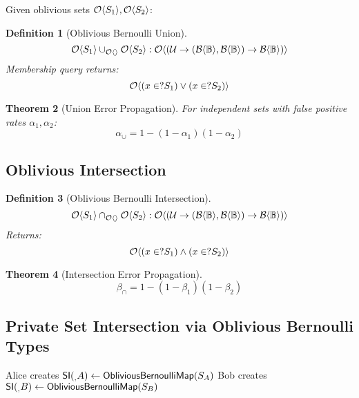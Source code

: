 \documentclass[11pt,final,hidelinks]{article}
\newcommand{\BernBool}{\mathcal{B}\langle \Bool \rangle}
\newcommand{\fprate}{\alpha}
\newcommand{\fnrate}{\beta}
\newtheorem{theorem}{Theorem}[section]
\newtheorem{definition}[theorem]{Definition}
\begin{document}
Given oblivious sets $\mathcal{O}\langle S_1 \rangle, \mathcal{O}\langle S_2 \rangle$:

\begin{definition}[Oblivious Bernoulli Union]
\begin{equation}
\Obv{S_1} \cup_{\Obv{}} \Obv{S_2} : \ObvMap{\Universe}{(\BernBool, \BernBool) \to \BernBool}
\end{equation}
Membership query returns:
\begin{equation}
\mathcal{O}\langle (x \in? S_1) \lor (x \in? S_2) \rangle
\end{equation}
\end{definition}

\begin{theorem}[Union Error Propagation]
For independent sets with false positive rates $\fprate_1, \fprate_2$:
\begin{equation}
\fprate_{\cup} = 1 - (1 - \fprate_1)(1 - \fprate_2)
\end{equation}
\end{theorem}

\subsection{Oblivious Intersection}

\begin{definition}[Oblivious Bernoulli Intersection]
\begin{equation}
\Obv{S_1} \cap_{\Obv{}} \Obv{S_2} : \ObvMap{\Universe}{(\BernBool, \BernBool) \to \BernBool}
\end{equation}
Returns:
\begin{equation}
\mathcal{O}\langle (x \in? S_1) \land (x \in? S_2) \rangle
\end{equation}
\end{definition}

\begin{theorem}[Intersection Error Propagation]
\begin{equation}
\fnrate_{\cap} = 1 - (1 - \fnrate_1)(1 - \fnrate_2)
\end{equation}
\end{theorem}

\subsection{Private Set Intersection via Oblivious Bernoulli Types}

\begin{algorithm}[H]
\caption{PSI via Oblivious Bernoulli Types}
Alice creates $\mathsf{SI}(_, A) \gets \mathsf{ObliviousBernoulliMap}(S_A)$\;
Bob creates $\mathsf{SI}(_, B) \gets \mathsf{ObliviousBernoulliMap}(S_B)$\;
\end{algorithm}
\end{document}
